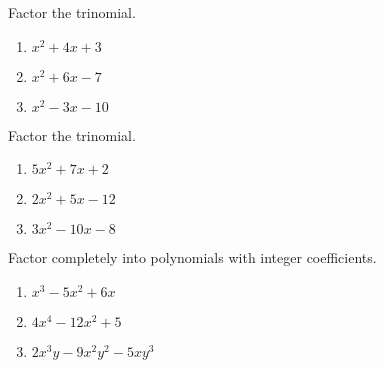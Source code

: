 \begin{exercise}
  Factor the trinomial.
  
  \begin{enumerate}
  \item
    \(x^2+4x+3\)
  \item
    \(x^2+6x-7\)
  \item
    \(x^2-3x-10\)
  \end{enumerate}
\end{exercise}

\begin{exercise}
  Factor the trinomial.
  
  \begin{enumerate}
  \item
    \(5x^2+7x+2\)
  \item
    \(2x^2+5x-12\)
  \item
    \(3x^2-10x-8\)
  \end{enumerate}
\end{exercise}

\begin{exercise}
  Factor completely into polynomials with integer coefficients.
  
  \begin{enumerate}
  \item
    \(x^3-5x^2+6x\)
  \item
    \(4x^4-12x^2+5\)
  \item
    \(2x^3y-9x^2y^2-5xy^3\)
  \end{enumerate}
\end{exercise}

